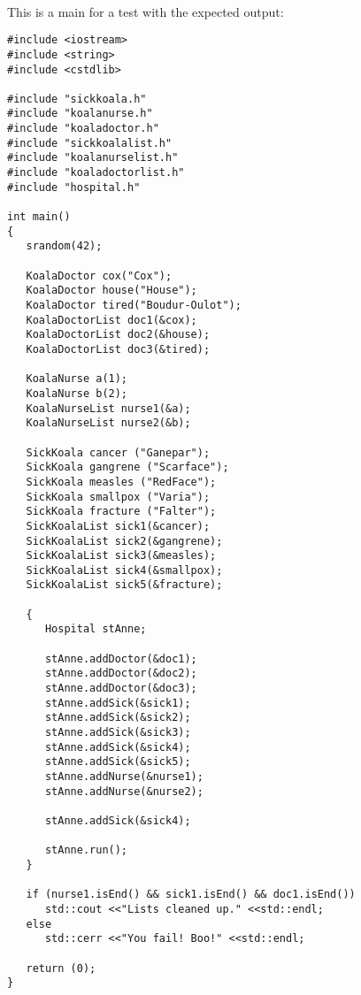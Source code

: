 ~\\
This is a main for a test with the expected output:
\begin{lstlisting}
#include <iostream>
#include <string>
#include <cstdlib>

#include "sickkoala.h"
#include "koalanurse.h"
#include "koaladoctor.h"
#include "sickkoalalist.h"
#include "koalanurselist.h"
#include "koaladoctorlist.h"
#include "hospital.h"

int main()
{
   srandom(42);

   KoalaDoctor cox("Cox");
   KoalaDoctor house("House");
   KoalaDoctor tired("Boudur-Oulot");
   KoalaDoctorList doc1(&cox);
   KoalaDoctorList doc2(&house);
   KoalaDoctorList doc3(&tired);

   KoalaNurse a(1);
   KoalaNurse b(2);
   KoalaNurseList nurse1(&a);
   KoalaNurseList nurse2(&b);

   SickKoala cancer ("Ganepar");
   SickKoala gangrene ("Scarface");
   SickKoala measles ("RedFace");
   SickKoala smallpox ("Varia");
   SickKoala fracture ("Falter");
   SickKoalaList sick1(&cancer);
   SickKoalaList sick2(&gangrene);
   SickKoalaList sick3(&measles);
   SickKoalaList sick4(&smallpox);
   SickKoalaList sick5(&fracture);

   {
      Hospital stAnne;

      stAnne.addDoctor(&doc1);
      stAnne.addDoctor(&doc2);
      stAnne.addDoctor(&doc3);
      stAnne.addSick(&sick1);
      stAnne.addSick(&sick2);
      stAnne.addSick(&sick3);
      stAnne.addSick(&sick4);
      stAnne.addSick(&sick5);
      stAnne.addNurse(&nurse1);
      stAnne.addNurse(&nurse2);

      stAnne.addSick(&sick4);

      stAnne.run();
   }

   if (nurse1.isEnd() && sick1.isEnd() && doc1.isEnd())
      std::cout <<"Lists cleaned up." <<std::endl;
   else
      std::cerr <<"You fail! Boo!" <<std::endl;

   return (0);
}
\end{lstlisting}

